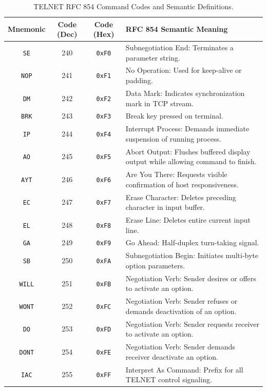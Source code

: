 \documentclass[12pt, a4paper]{article}
\begin{document}
\begin{table}[H]
\centering
\small
\begin{tabularx}{\linewidth}{|c|c|c|X|}
\hline
\textbf{Mnemonic} & \textbf{Code (Dec)} & \textbf{Code (Hex)} & \textbf{RFC 854 Semantic Meaning} \\ \hline
\texttt{SE} & 240 & \texttt{0xF0} & Subnegotiation End: Terminates a parameter string. \\ \hline
\texttt{NOP} & 241 & \texttt{0xF1} & No Operation: Used for keep-alive or padding. \\ \hline
\texttt{DM} & 242 & \texttt{0xF2} & Data Mark: Indicates synchronization mark in TCP stream. \\ \hline
\texttt{BRK} & 243 & \texttt{0xF3} & Break key pressed on terminal. \\ \hline
\texttt{IP} & 244 & \texttt{0xF4} & Interrupt Process: Demands immediate suspension of running process. \\ \hline
\texttt{AO} & 245 & \texttt{0xF5} & Abort Output: Flushes buffered display output while allowing command to finish. \\ \hline
\texttt{AYT} & 246 & \texttt{0xF6} & Are You There: Requests visible confirmation of host responsiveness. \\ \hline
\texttt{EC} & 247 & \texttt{0xF7} & Erase Character: Deletes preceding character in input buffer. \\ \hline
\texttt{EL} & 248 & \texttt{0xF8} & Erase Line: Deletes entire current input line. \\ \hline
\texttt{GA} & 249 & \texttt{0xF9} & Go Ahead: Half-duplex turn-taking signal. \\ \hline
\texttt{SB} & 250 & \texttt{0xFA} & Subnegotiation Begin: Initiates multi-byte option parameters. \\ \hline
\texttt{WILL} & 251 & \texttt{0xFB} & Negotiation Verb: Sender desires or offers to activate an option. \\ \hline
\texttt{WONT} & 252 & \texttt{0xFC} & Negotiation Verb: Sender refuses or demands deactivation of an option. \\ \hline
\texttt{DO} & 253 & \texttt{0xFD} & Negotiation Verb: Sender requests receiver to activate an option. \\ \hline
\texttt{DONT} & 254 & \texttt{0xFE} & Negotiation Verb: Sender demands receiver deactivate an option. \\ \hline
\texttt{IAC} & 255 & \texttt{0xFF} & Interpret As Command: Prefix for all TELNET control signaling. \\ \hline
\end{tabularx}
\caption{TELNET RFC 854 Command Codes and Semantic Definitions.}
\label{tab:telnet_cmds}
\end{table}
\end{document}
